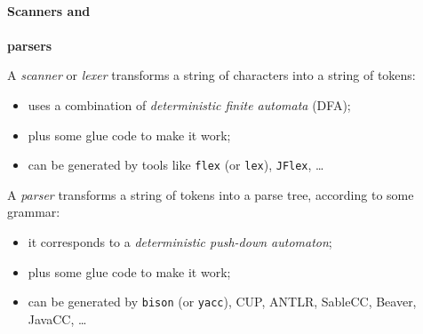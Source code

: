 



\begin{slide*}
\begin{tabbing}
~\\
{\Huge\bf Scanners and}\\ ~\\ {\Huge\bf parsers}\\
\end{tabbing}

\begin{center}
\end{center}

\vfil
\end{slide*}

\begin{slide*}
A {\em scanner\/} or {\em lexer} transforms a string of characters into a string
of tokens:
\begin{itemize}
\item uses a combination of {\em deterministic finite automata} (DFA);
\item plus some glue code to make it work;
\item can be generated by tools like {\tt flex} (or {\tt lex}), {\tt JFlex}, \ldots 
\end{itemize}
\vspace*{1em}

\vfil
\end{slide*}

\begin{slide*}
A {\em parser\/} transforms a string of tokens into a parse tree, according to some
grammar:
\begin{itemize}
\item it corresponds to a {\em deterministic push-down automaton};
\item plus some glue code to make it work;
\item can be generated by {\tt bison} (or {\tt yacc}), CUP, ANTLR, SableCC,
Beaver, JavaCC, \ldots
\end{itemize}
\vspace*{1em}

\vfil
\end{slide*}



